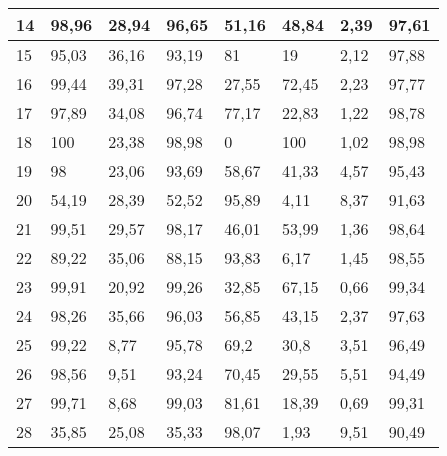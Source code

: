 \begin{longtable}[c]{|l|l|l|l|l|l|l|l|}
14              & 98,96        & 28,94        & 96,65       & 51,16         & 48,84         & 2,39          & 97,61         \\ \hline
15              & 95,03        & 36,16        & 93,19       & 81            & 19            & 2,12          & 97,88         \\ \hline
16              & 99,44        & 39,31        & 97,28       & 27,55         & 72,45         & 2,23          & 97,77         \\ \hline
17              & 97,89        & 34,08        & 96,74       & 77,17         & 22,83         & 1,22          & 98,78         \\ \hline
18              & 100          & 23,38        & 98,98       & 0             & 100           & 1,02          & 98,98         \\ \hline
19              & 98           & 23,06        & 93,69       & 58,67         & 41,33         & 4,57          & 95,43         \\ \hline
20              & 54,19        & 28,39        & 52,52       & 95,89         & 4,11          & 8,37          & 91,63         \\ \hline
21              & 99,51        & 29,57        & 98,17       & 46,01         & 53,99         & 1,36          & 98,64         \\ \hline
22              & 89,22        & 35,06        & 88,15       & 93,83         & 6,17          & 1,45          & 98,55         \\ \hline
23              & 99,91        & 20,92        & 99,26       & 32,85         & 67,15         & 0,66          & 99,34         \\ \hline
24              & 98,26        & 35,66        & 96,03       & 56,85         & 43,15         & 2,37          & 97,63         \\ \hline
25              & 99,22        & 8,77         & 95,78       & 69,2          & 30,8          & 3,51          & 96,49         \\ \hline
26              & 98,56        & 9,51         & 93,24       & 70,45         & 29,55         & 5,51          & 94,49         \\ \hline
27              & 99,71        & 8,68         & 99,03       & 81,61         & 18,39         & 0,69          & 99,31         \\ \hline
28              & 35,85        & 25,08        & 35,33       & 98,07         & 1,93          & 9,51          & 90,49         \\ \hline

\end{longtable}
